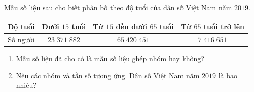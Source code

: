 \begin{vd}%
	Mẫu số liệu sau cho biết phân bố theo độ tuổi của dân số Việt Nam năm $2019$.
	\begin{center}
		\begin{tabular}{|c|c|c|c|}
			\hline
			Độ tuổi&Dưới $15$ tuổi&Từ $15$ đến dưới $65$ tuổi&Từ $65$ tuổi trở lên\\
			\hline
			Số người& $23\;371\;882$&$65\;420\;451$&$7\;416\;651$\\
			\hline
		\end{tabular}
	\end{center}
	\begin{enumerate}
		\item Mẫu số liệu đã cho có là mẫu số liệu ghép nhóm hay không?
		\item Nêu các nhóm và tần số tương ứng. Dân số Việt Nam năm $2019$ là bao nhiêu?
	\end{enumerate}
\end{vd}


